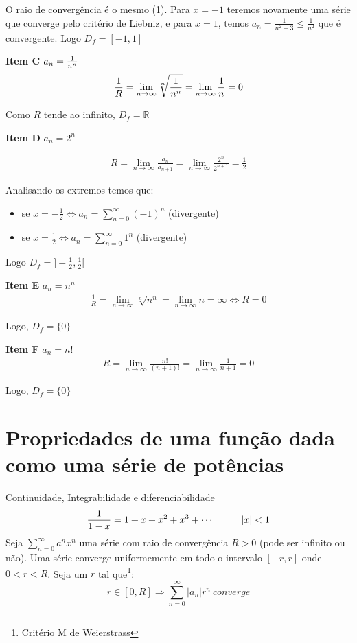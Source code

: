 \documentclass[12pt,openany, letterpaper]{book}
\newcommand{\LI}[1][n]{\lim_{{#1} \rightarrow \infty}}
\newcommand{\soma}[2][n]{\sum_{{#1} = #2}^\infty}
\newcommand{\cmw}{Critério M de Weierstrass }
\begin{document}
{{O raio de convergência é o mesmo (1). Para $x =-1$ teremos novamente uma série que converge pelo critério de Liebniz, e para $x = 1$, temos $a_n = \frac{1}{n^2+3} \leq \frac{1}{n^2}$ que é convergente. Logo $D_f = [-1,1]$ \vspace{5mm}

\textbf{Item C} $a_n = {1 \over n^n}$
\begin{align*}
{1 \over R} = \LI \sqrt[n]{1 \over n^n} = \LI \frac{1}{n} = 0
\end{align*}

Como $R$ tende ao infinito, $D_f = \mathds{R}$ \vspace{5mm}

\textbf{Item D} $a_n = 2^n$ \vspace{5mm}

\begin{align*}
R = \LI \frac{a_n}{a_{n+1}} = \LI \frac{2^n}{2^{n+1}} = \frac{1}{2}
\end{align*}

Analisando os extremos temos que: \begin{itemize}
\item se $\displaystyle{x = -\frac{1}{2} \Longleftrightarrow a_n = \soma{0} (-1)^n}$ (divergente)
\item se $\displaystyle{x = \frac{1}{2} \Longleftrightarrow a_n = \soma{0} 1^n}$ (divergente)
\end{itemize}

Logo $D_f = ]-\frac{1}{2},\frac{1}{2}[$ \vspace{5mm}

\textbf{Item E} $a_n = n^n$
\begin{align*}
\frac{1}{R} = \LI \sqrt[n]{n^n} = \LI n = \infty \Longleftrightarrow R = 0
\end{align*}

Logo, $D_f = \{0\}$ \vspace{5mm}

\textbf{Item F} $a_n = n!$
\begin{align*}
R = \LI \frac{n!}{(n+1)!} = \LI \frac{1}{n+1} = 0
\end{align*}

Logo, $D_f = \{0\}$

\section{Propriedades de uma função dada como uma série de potências}{Continuidade, Integrabilidade e diferenciabilidade}
$$\frac{1}{1-x}= 1 + x +x^2 + x^3 + \cdots \hspace{10mm} |x| < 1 $$
\hspace{5mm}Seja $\displaystyle{\soma{0} a^n x^n}$ uma série com raio de convergência $R > 0$ (pode ser infinito ou não). Uma série converge uniformemente em todo o intervalo $[-r,r]$ onde $0 < r < R$. Seja um $r$ tal que\footnote{\cmw}: $$r \in [0,R] \Rightarrow \soma{0}|a_n|r^n \ converge$$

}}
\end{document}
